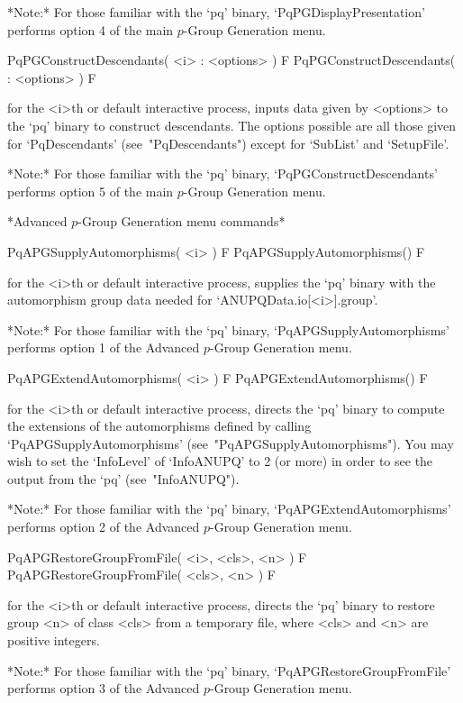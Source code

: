 *Note:*
For  those  familiar  with  the  `pq'  binary,  `PqPGDisplayPresentation'
performs option 4 of the main $p$-Group Generation menu.

\>PqPGConstructDescendants( <i> : <options> ) F
\>PqPGConstructDescendants( : <options> ) F

for the <i>th or default interactive {\ANUPQ} process, inputs data  given
by <options> to the `pq' binary to  construct  descendants.  The  options
possible are all those given  for  `PqDescendants'  (see~"PqDescendants")
except for `SubList' and `SetupFile'.

*Note:* 
For those  familiar  with  the  `pq'  binary,  `PqPGConstructDescendants'
performs option 5 of the main $p$-Group Generation menu.

*Advanced $p$-Group Generation menu commands*

\>PqAPGSupplyAutomorphisms( <i> ) F
\>PqAPGSupplyAutomorphisms() F

for the <i>th or default interactive {\ANUPQ} process, supplies the  `pq'
binary    with    the    automorphism    group    data     needed     for
`ANUPQData.io[<i>].group'.

*Note:*
For those  familiar  with  the  `pq'  binary,  `PqAPGSupplyAutomorphisms'
performs option 1 of the Advanced $p$-Group Generation menu.

\>PqAPGExtendAutomorphisms( <i> ) F
\>PqAPGExtendAutomorphisms() F

for the <i>th or default interactive {\ANUPQ} process, directs  the  `pq'
binary to compute the extensions of the automorphisms defined by  calling
`PqAPGSupplyAutomorphisms' (see~"PqAPGSupplyAutomorphisms"). You may wish
to set the `InfoLevel' of `InfoANUPQ' to 2 (or more) in order to see  the
output from the `pq' (see~"InfoANUPQ").

*Note:*
For  those  familiar  with  the  `pq'  binary, `PqAPGExtendAutomorphisms'
performs option 2 of the Advanced $p$-Group Generation menu.

\>PqAPGRestoreGroupFromFile( <i>, <cls>, <n> ) F
\>PqAPGRestoreGroupFromFile( <cls>, <n> ) F

for the <i>th or default interactive {\ANUPQ} process, directs  the  `pq'
binary to restore group <n> of class <cls> from a temporary  file,  where
<cls> and <n> are positive integers.

*Note:*
For those familiar  with  the  `pq'  binary,  `PqAPGRestoreGroupFromFile'
performs option 3 of the Advanced $p$-Group Generation menu.

